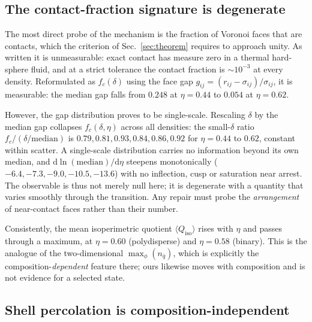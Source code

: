 \documentclass[11pt]{article}
\begin{document}
\subsection{The contact-fraction signature is degenerate}

The most direct probe of the mechanism is the fraction of Voronoi faces that are
contacts, which the criterion of Sec.~\ref{sec:theorem} requires to approach
unity. As written it is unmeasurable: exact contact has measure zero in a thermal
hard-sphere fluid, and at a strict tolerance the contact fraction is $\sim10^{-3}$
at every density. Reformulated as $f_c(\delta)$ using the face gap
$g_{ij}=(r_{ij}-\sigma_{ij})/\sigma_{ij}$, it is measurable: the median gap falls
from $0.248$ at $\eta=0.44$ to $0.054$ at $\eta=0.62$.

However, the gap distribution proves to be single-scale. Rescaling $\delta$ by the
median gap collapses $f_c(\delta,\eta)$ across all densities: the small-$\delta$
ratio $f_c/(\delta/\mathrm{median})$ is $0.79, 0.81, 0.93, 0.84, 0.86, 0.92$ for
$\eta=0.44$ to $0.62$, constant within scatter. A single-scale distribution
carries no information beyond its own median, and
$\mathrm{d}\ln(\mathrm{median})/\mathrm{d}\eta$ steepens monotonically
($-6.4,-7.3,-9.0,-10.5,-13.6$) with no inflection, cusp or saturation near
arrest. The observable is thus not merely null here; it is degenerate with a
quantity that varies smoothly through the transition. Any repair must probe the
\emph{arrangement} of near-contact faces rather than their number.

Consistently, the mean isoperimetric quotient $\langle Q_{\mathrm{iso}}\rangle$
rises with $\eta$ and passes through a maximum, at $\eta=0.60$ (polydisperse) and
$\eta=0.58$ (binary). This is the analogue of the two-dimensional
$\max_\phi(n_{\bar q})$, which is explicitly the composition-\emph{dependent}
feature there; ours likewise moves with composition and is not evidence for a
selected state.

\subsection{Shell percolation is composition-independent}
\end{document}
